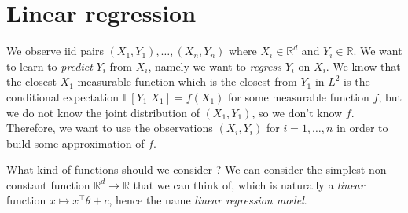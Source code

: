 \documentclass[
	fontsize=11pt, %
	twoside=false, %
	numbers=noenddot, %
]{kaobook}
\newcommand{\E}{\mathbb E}
\newcommand{\R}{\mathbb R}
\newcommand{\go}{\rightarrow}
\begin{document}
\mainmatter %









\setchapterpreamble[u]{\margintoc}
\chapter{Linear regression}
\label{chap:linear_regression}

We observe iid pairs $(X_1, Y_1), \ldots, (X_n, Y_n)$ where $X_i \in \R^d$ and $Y_i \in \R$.
We want to learn to \emph{predict} $Y_i$ from $X_i$, namely we want to \emph{regress} $Y_i$ on $X_i$.
We know that the closest $X_1$-measurable function which is the closest from $Y_1$ in $L^2$ is the conditional expectation $\E [Y_1 | X_1] = f(X_1)$ for some measurable function $f$, but we do not know the joint distribution of $(X_1, Y_1)$, so we don't know $f$.
Therefore, we want to use the observations $(X_i, Y_i)$ for $i=1, \ldots, n$ in order to build some approximation of $f$.

What kind of functions should we consider ?
We can consider the simplest non-constant function $\R^d \go \R$ that we can think of, which is naturally a \emph{linear} function $x \mapsto x^\top \theta + c$, hence the name \emph{linear regression model}.
\end{document}
